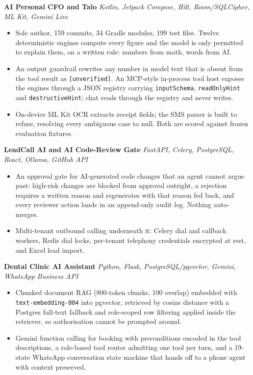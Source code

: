 \documentclass[10pt,a4paper]{article}
\begin{document}
\textbf{AI Personal CFO and Talo} \textit{Kotlin, Jetpack Compose, Hilt, Room/SQLCipher, ML Kit, Gemini Live}
\begin{itemize}
  \item Sole author, 159 commits, 34 Gradle modules, 199 test files. Twelve deterministic engines
        compute every figure and the model is only permitted to explain them, on a written rule:
        numbers from math, words from AI.
  \item An output guardrail rewrites any number in model text that is absent from the tool result as
        \texttt{[unverified]}. An MCP-style in-process tool host exposes the engines through a JSON
        registry carrying \texttt{inputSchema}, \texttt{readOnlyHint} and \texttt{destructiveHint};
        chat reads through the registry and never writes.
  \item On-device ML Kit OCR extracts receipt fields; the SMS parser is built to refuse, resolving
        every ambiguous case to null. Both are scored against frozen evaluation fixtures.
\end{itemize}

\vspace{1pt}
\textbf{LeadCall AI and AI Code-Review Gate} \textit{FastAPI, Celery, PostgreSQL, React, Ollama, GitHub API}
\begin{itemize}
  \item An approval gate for AI-generated code changes that an agent cannot argue past: high-risk
        changes are blocked from approval outright, a rejection requires a written reason and
        regenerates with that reason fed back, and every reviewer action lands in an append-only
        audit log. Nothing auto-merges.
  \item Multi-tenant outbound calling underneath it: Celery dial and callback workers, Redis dial
        locks, per-tenant telephony credentials encrypted at rest, and Excel lead import.
\end{itemize}

\vspace{1pt}
\textbf{Dental Clinic AI Assistant} \textit{Python, Flask, PostgreSQL/pgvector, Gemini, WhatsApp Business API}
\begin{itemize}
  \item Chunked document RAG (800-token chunks, 100 overlap) embedded with
        \texttt{text-embedding-004} into pgvector, retrieved by cosine distance with a Postgres
        full-text fallback and role-scoped row filtering applied inside the retriever, so
        authorisation cannot be prompted around.
  \item Gemini function calling for booking with preconditions encoded in the tool descriptions, a
        role-based tool router admitting one tool per turn, and a 19-state WhatsApp conversation
        state machine that hands off to a phone agent with context preserved.
\end{itemize}
\end{document}
